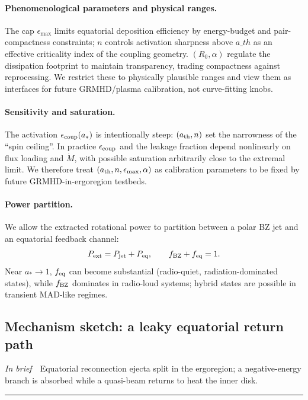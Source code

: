 \documentclass[twocolumn]{aastex701}
\newcommand{\ath}{a_{\rm th}}
\newcommand{\rg}{r_g}
\newcommand{\LEdd}{L_{\rm Edd}}
\newcommand{\Ltot}{L_{\rm tot}}
\newcommand{\FeKa}{\mathrm{Fe\,K}\alpha}
\DeclareRobustCommand{\tldr}[1]{%
  \noindent\textit{In brief}\ \textemdash\ #1%
  \par\smallskip
  \noindent\rule{\columnwidth}{0.2pt}\par\medskip
}
\def\ath{a\_th}\def\rg{r\_g}\def\LEdd{L\_Edd}\def\Ltot{L\_tot}\def\FeKa{Fe K\string\alpha}%
\begin{document}
\paragraph{Phenomenological parameters and physical ranges.}
The cap $\epsilon_{\max}$ limits equatorial deposition efficiency by energy-budget and pair-compactness constraints; $n$ controls activation sharpness above $\ath$ as an effective criticality index of the coupling geometry. $(R_0,\alpha)$ regulate the dissipation footprint to maintain transparency, trading compactness against reprocessing. We restrict these to physically plausible ranges and view them as interfaces for future GRMHD/plasma calibration, not curve-fitting knobs.
\paragraph{Sensitivity and saturation.}
The activation $\epsilon_{\rm coup}(a_*)$ is intentionally steep: $(a_{\rm th},n)$ set the narrowness of the “spin ceiling”. In practice $\epsilon_{\rm coup}$ and the leakage fraction depend nonlinearly on flux loading and $\dot M$, with possible saturation arbitrarily close to the extremal limit. We therefore treat $(a_{\rm th},n,\epsilon_{\max},\alpha)$ as calibration parameters to be fixed by future GRMHD-in-ergoregion testbeds.


\paragraph{Power partition.}
We allow the extracted rotational power to partition between a polar BZ jet and an equatorial feedback channel:
\[
P_{\rm ext}=P_{\rm jet}+P_{\rm eq},\qquad f_{\rm BZ}+f_{\rm eq}=1.
\]
Near $a_*\!\to\!1$, $f_{\rm eq}$ can become substantial (radio-quiet, radiation-dominated states), while $f_{\rm BZ}$ dominates in radio-loud systems; hybrid states are possible in transient MAD-like regimes.
\subsection{Mechanism sketch: a leaky equatorial return path}\label{sec:mech-sketch}
\tldr{Equatorial reconnection ejecta split in the ergoregion; a negative-energy branch is absorbed while a quasi-beam returns to heat the inner disk.}
\end{document}
